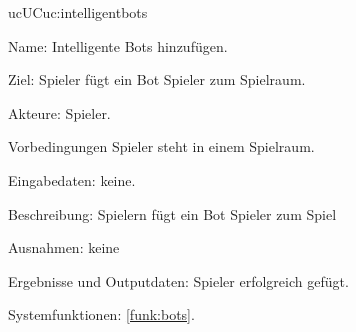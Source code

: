 \begin{description}[leftmargin=5em, style=sameline]
    \begin{lhp}{uc}{UC}{uc:intelligentbots}
    	\item [Name:] Intelligente Bots hinzufügen.
    	\item [Ziel:] Spieler fügt ein Bot Spieler zum Spielraum.
    	\item [Akteure:] Spieler.
    	\item [Vorbedingungen] Spieler steht in einem Spielraum. 
      	\item [Eingabedaten:] keine.
    	\item [Beschreibung:] Spielern fügt ein Bot Spieler zum Spiel
    	\item [Ausnahmen:] keine 
    	\item [Ergebnisse und Outputdaten:] Spieler erfolgreich gefügt.
    	\item [Systemfunktionen:] \ref{funk:bots}.
    \end{lhp}


\end{description}